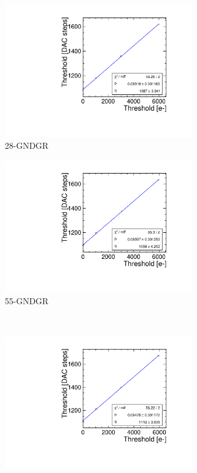 \begin{figure}[htbp]
\begin{subfigure}[b]{0.45\textwidth}
    \includegraphics[width=0.9\textwidth]{./figures/Calibration/THLcalibration_W0019_L08.pdf}
    \caption{28-GNDGR}
  \end{subfigure} \hfill
  \begin{subfigure}[b]{0.45\textwidth}
    \includegraphics[width=0.9\textwidth]{./figures/Calibration/THLcalibration_W0019_C07.pdf}
    \caption{55-GNDGR}
  \end{subfigure}\\
  \begin{subfigure}[b]{0.45\textwidth}
    \includegraphics[width=0.9\textwidth]{./figures/Calibration/THLcalibration_W0005_E02.pdf}

\end{subfigure}
\end{figure}
